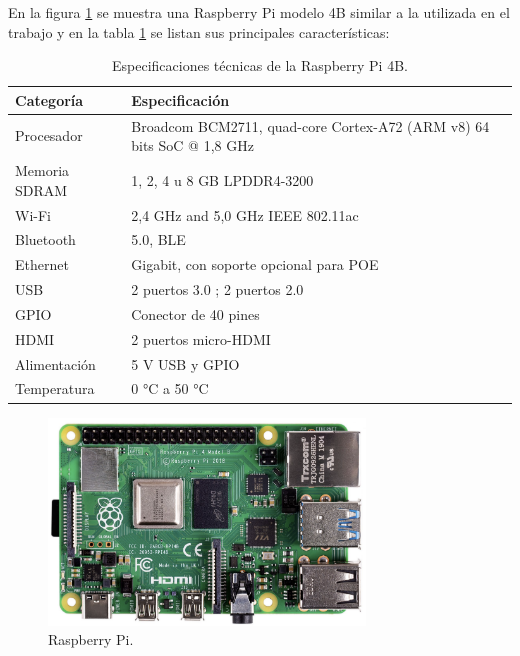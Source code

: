 En la figura \ref{fig:rpi} se muestra una Raspberry Pi modelo 4B similar a la utilizada en el trabajo y en la tabla \ref{tab:raspberrypi} se listan sus principales características: 
 
\begin{table}[h]
\centering
\caption[Especificaciones técnicas de la Raspberry Pi 4B.]{Especificaciones técnicas de la Raspberry Pi 4B.}

\begin{tabular}{p{3cm} p{8cm}} 
\toprule
\textbf{Categoría} & \textbf{Especificación}\\

\midrule
Procesador	& Broadcom BCM2711, quad-core Cortex-A72 (ARM v8) 64 bits SoC @ 1,8 GHz \\
Memoria SDRAM	 & 1, 2, 4 u 8 GB LPDDR4-3200 \\
Wi-Fi	& 2,4 GHz and 5,0 GHz IEEE 802.11ac \\
Bluetooth	&  5.0, BLE \\
Ethernet	& Gigabit, con soporte opcional para POE\\
USB	& 2 puertos  3.0 ; 2 puertos 2.0\\
GPIO	&	Conector de 40 pines\\
HDMI	&  2 puertos micro-HDMI\\
Alimentación	& 5 V USB y GPIO\\
Temperatura	& 0 °C a 50 °C \\
\bottomrule
\hline
\end{tabular}
\label{tab:raspberrypi}
\end{table}
 
\begin{figure}[h]
	\centering
	\includegraphics[width=0.75\textwidth]{./Figures/rpi.png}
	\caption[Raspberry Pi.]{Raspberry Pi\protect\footnotemark.}
	\label{fig:rpi}
\end{figure}

